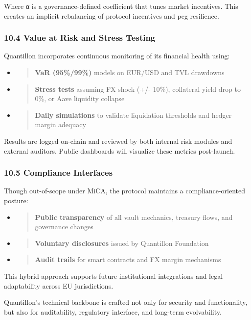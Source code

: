 Where α is a governance-defined coefficient that tunes market
incentives. This creates an implicit rebalancing of protocol incentives
and peg resilience.

\hypertarget{value-at-risk-and-stress-testing}{%
\subsubsection{10.4 Value at Risk and Stress
Testing}\label{value-at-risk-and-stress-testing}}

Quantillon incorporates continuous monitoring of its financial health
using:

\begin{itemize}
\item
  \begin{quote}
  \textbf{VaR (95\%/99\%)} models on EUR/USD and TVL drawdowns
  \end{quote}
\item
  \begin{quote}
  \textbf{Stress tests} assuming FX shock (+/- 10\%), collateral yield
  drop to 0\%, or Aave liquidity collapse
  \end{quote}
\item
  \begin{quote}
  \textbf{Daily simulations} to validate liquidation thresholds and
  hedger margin adequacy
  \end{quote}
\end{itemize}

Results are logged on-chain and reviewed by both internal risk modules
and external auditors. Public dashboards will visualize these metrics
post-launch.

\hypertarget{compliance-interfaces}{%
\subsubsection{10.5 Compliance Interfaces}\label{compliance-interfaces}}

Though out-of-scope under MiCA, the protocol maintains a
compliance-oriented posture:

\begin{itemize}
\item
  \begin{quote}
  \textbf{Public transparency} of all vault mechanics, treasury flows,
  and governance changes
  \end{quote}
\item
  \begin{quote}
  \textbf{Voluntary disclosures} issued by Quantillon Foundation
  \end{quote}
\item
  \begin{quote}
  \textbf{Audit trails} for smart contracts and FX margin mechanisms
  \end{quote}
\end{itemize}

This hybrid approach supports future institutional integrations and
legal adaptability across EU jurisdictions.

Quantillon's technical backbone is crafted not only for security and
functionality, but also for auditability, regulatory interface, and
long-term evolvability.
